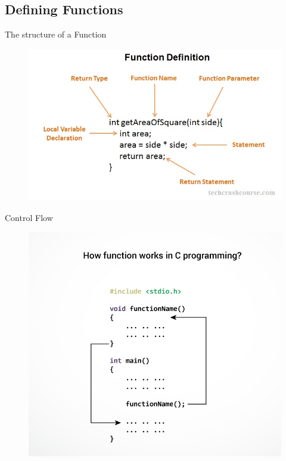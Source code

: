 \subsection{Defining Functions}
\begin{frame}[fragile]{The structure of a Function}{}
\begin{figure}
    \begin{center}
        \includegraphics[width=0.8\linewidth]{images/func_label.jpg}
    \end{center}
\end{figure}
\end{frame}

\begin{frame}[fragile]{Control Flow}{}
\begin{figure}
    \begin{center}
        \includegraphics[width=0.8\linewidth]{images/func_flow.jpg}
    \end{center}
\end{figure}
\end{frame}

